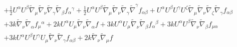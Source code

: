 \documentclass[10pt,letterpaper]{article}
\numberwithin{equation}{section}
\begin{document}
\begin{eqnarray}
&& + \tfrac{1}{2} U^{\alpha } U^{\beta } \tilde{\nabla}_{\mu }\tilde{\nabla}_{\nu }\tilde{\nabla}_{\gamma }\tilde{\nabla}_{\beta }f_{\alpha }{}^{\gamma } + \tfrac{1}{2} U^{\alpha } U^{\beta } \tilde{\nabla}_{\mu }\tilde{\nabla}_{\nu }\tilde{\nabla}_{\gamma }\tilde{\nabla}^{\gamma }f_{\alpha \beta } + U^{\alpha } U^{\beta } U^{\gamma } U^{\zeta } \tilde{\nabla}_{\mu }\tilde{\nabla}_{\nu }\tilde{\nabla}_{\zeta }\tilde{\nabla}_{\gamma }f_{\alpha \beta } \nonumber \\ 
&& + 3 k \tilde{\nabla}_{\nu }\tilde{\nabla}_{\alpha }f_{\mu }{}^{\alpha } + 2 k U^{\alpha } U_{\mu } \tilde{\nabla}_{\nu }\tilde{\nabla}_{\alpha }f + 3 k U^{\alpha } U_{\mu } \tilde{\nabla}_{\nu }\tilde{\nabla}_{\beta }f_{\alpha }{}^{\beta } + 3 k U^{\alpha } U^{\beta } \tilde{\nabla}_{\nu }\tilde{\nabla}_{\beta }f_{\mu \alpha } \nonumber \\ 
&& + 3 k U^{\alpha } U^{\beta } U^{\gamma } U_{\mu } \tilde{\nabla}_{\nu }\tilde{\nabla}_{\gamma }f_{\alpha \beta } + 2 k \tilde{\nabla}_{\nu }\tilde{\nabla}_{\mu }f
\end{eqnarray}
\end{document}
